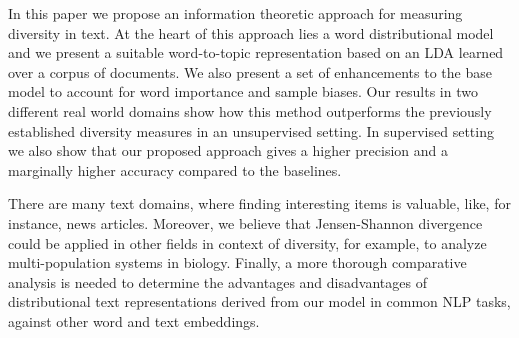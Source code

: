 In this paper we propose an information theoretic approach for measuring diversity in text. At the heart of this approach lies a word distributional model and we present a suitable word-to-topic representation based on an LDA learned over a corpus of documents. We also present a set of enhancements to the base model to account for word importance and sample biases. Our results in two different real world domains show how this method outperforms the previously established  diversity measures in an unsupervised setting. In supervised setting we also show that our proposed approach gives a higher precision and a marginally higher accuracy compared to the baselines.

There are many text domains, where finding interesting items is valuable, 
like, for instance, news articles. Moreover, we believe that Jensen-Shannon 
divergence could be applied in other fields in context of diversity, for example, 
to analyze multi-population systems in biology. Finally, a more thorough comparative analysis 
is needed to determine the advantages and disadvantages of distributional text 
representations derived from our model in common NLP tasks, 
against other word and text embeddings.

 